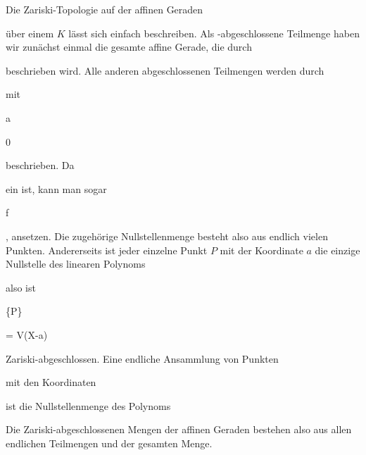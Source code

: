 

{


Die Zariski-Topologie auf der affinen Geraden


 über einem
$K$ lässt sich einfach beschreiben. Als
 {} {-}abgeschlossene Teilmenge haben wir zunächst einmal die gesamte affine Gerade, die durch


 beschrieben wird. Alle anderen abgeschlossenen Teilmengen werden durch


 mit


\mavergleichskette


{\vergleichskette


{ {\mathfrak a}
}


{ \neq }{ 0
}


{  }{
}


{    }{
}


{   }{
}


}
{}{}{}
beschrieben. Da


 ein
ist, kann man sogar


 {}


 {f } {}


 {} {} {} {,}
ansetzen. Die zugehörige Nullstellenmenge besteht also aus endlich vielen Punkten. Andererseits ist jeder einzelne Punkt $P$ mit der Koordinate $a$ die einzige Nullstelle des linearen Polynoms


 also ist


\mavergleichskette


{\vergleichskette


{ \{P\}
}


{ = }{ V(X-a)
}


{  }{
}


{    }{
}


{   }{
}


}
{}{}{}
Zariski-abgeschlossen. Eine endliche Ansammlung von Punkten


 mit den Koordinaten


 ist die Nullstellenmenge des Polynoms


 Die Zariski-abgeschlossenen Mengen der affinen Geraden bestehen also aus allen endlichen Teilmengen
 {} {}
und der gesamten Menge.


}


